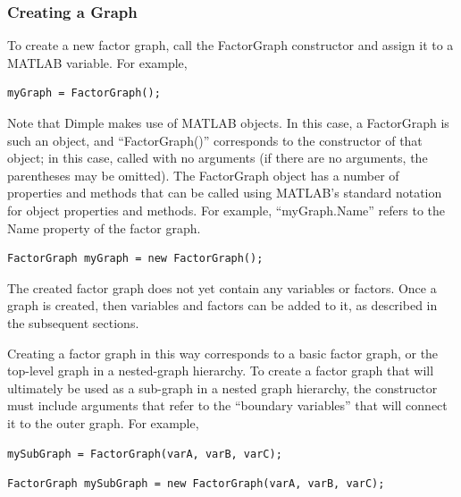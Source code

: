 \subsubsection{Creating a Graph}

To create a new factor graph, call the FactorGraph constructor and assign it to a MATLAB variable.  For example,

\ifmatlab

\begin{lstlisting}
myGraph = FactorGraph();
\end{lstlisting}

Note that Dimple makes use of MATLAB objects.  In this case, a FactorGraph is such an object, and ``FactorGraph()'' corresponds to the constructor of that object; in this case, called with no arguments (if there are no arguments, the parentheses may be omitted).  The FactorGraph object has a number of properties and methods that can be called using MATLAB's standard notation for object properties and methods.  For example, ``myGraph.Name'' refers to the Name property of the factor graph.

\fi

\ifjava

\begin{lstlisting}
FactorGraph myGraph = new FactorGraph();
\end{lstlisting}

\fi

The created factor graph does not yet contain any variables or factors.  Once a graph is created, then variables and factors can be added to it, as described in the subsequent sections.

Creating a factor graph in this way corresponds to a basic factor graph, or the top-level graph in a nested-graph hierarchy.  To create a factor graph that will ultimately be used as a sub-graph in a nested graph hierarchy, the constructor must include arguments that refer to the ``boundary variables'' that will connect it to the outer graph.  For example,

\ifmatlab

\begin{lstlisting}
mySubGraph = FactorGraph(varA, varB, varC);
\end{lstlisting}

\fi

\ifjava
\begin{lstlisting}
FactorGraph mySubGraph = new FactorGraph(varA, varB, varC);
\end{lstlisting}

